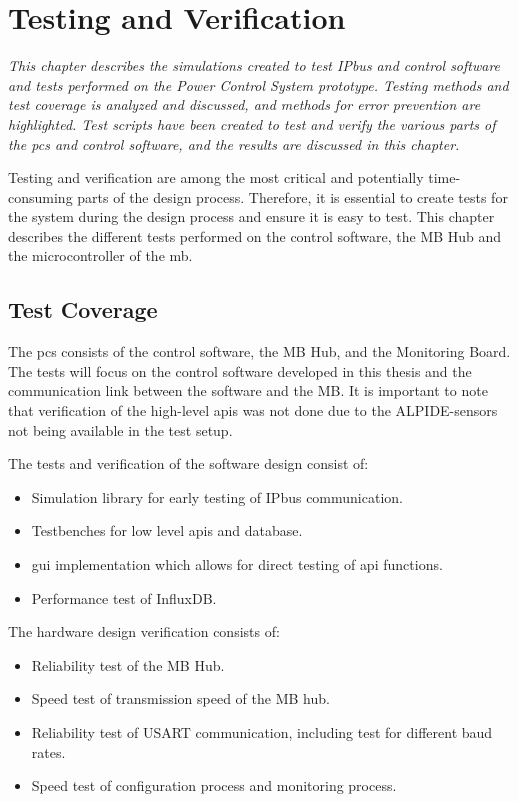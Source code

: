 \documentclass[main.tex]{subfiles}
\begin{document}
\section{Testing and Verification}
\label{section:testV}
\textit{This chapter describes the simulations created to test IPbus and control software and tests performed on the Power Control System prototype. Testing methods and test coverage is analyzed and discussed, and methods for error prevention are highlighted. Test scripts have been created to test and verify the various parts of the \gls{pcs} and control software, and the results are discussed in this chapter.}

Testing and verification are among the most critical and potentially time-consuming parts of the design process. Therefore, it is essential to create tests for the system during the design process and ensure it is easy to test. This chapter describes the different tests performed on the control software, the MB Hub and the microcontroller of the \gls{mb}.

\subsection{Test Coverage}

The \gls{pcs} consists of the control software, the MB Hub, and the Monitoring Board. The tests will focus on the control software developed in this thesis and the communication link between the software and the MB. It is important to note that verification of the high-level \gls{api}s was not done due to the ALPIDE-sensors not being available in the test setup.

The tests and verification of the software design consist of:

\begin{itemize}
    \item Simulation library for early testing of IPbus communication.
    \item Testbenches for low level \gls{api}s and database.
    \item \gls{gui} implementation which allows for direct testing of \gls{api} functions.
    \item Performance test of InfluxDB.
\end{itemize}

The hardware design verification consists of:

\begin{itemize}
    \item Reliability test of the MB Hub.
    \item Speed test of transmission speed of the MB hub.
    \item Reliability test of USART communication, including test for different baud rates.
    \item Speed test of configuration process and monitoring process.
\end{itemize}
\end{document}

